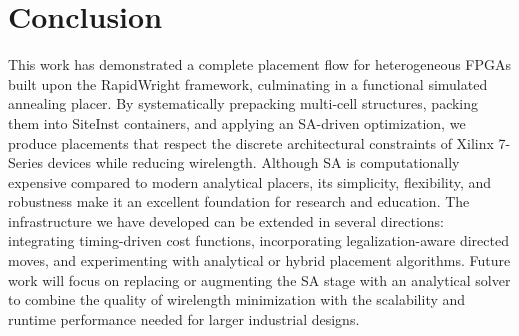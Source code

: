 \section{Conclusion}

This work has demonstrated a complete placement flow for heterogeneous FPGAs built upon the RapidWright framework, culminating in a functional simulated annealing placer. 
By systematically prepacking multi-cell structures, packing them into SiteInst containers, and applying an SA-driven optimization, we produce placements that respect the discrete architectural constraints of Xilinx 7-Series devices while reducing wirelength. 
Although SA is computationally expensive compared to modern analytical placers, its simplicity, flexibility, and robustness make it an excellent foundation for research and education. 
The infrastructure we have developed can be extended in several directions: integrating timing-driven cost functions, incorporating legalization-aware directed moves, and experimenting with analytical or hybrid placement algorithms. 
Future work will focus on replacing or augmenting the SA stage with an analytical solver to combine the quality of wirelength minimization with the scalability and runtime performance needed for larger industrial designs.

